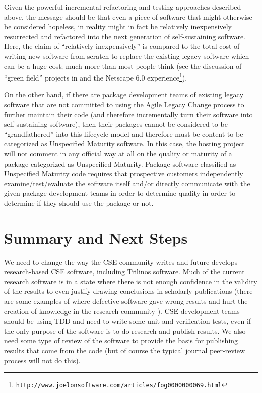 \documentclass[11pt]{SANDreport}
\begin{document}
Given the powerful incremental refactoring and testing approaches described above, the message should be that even a piece of software that might otherwise be considered hopeless, in reality might in fact be relatively inexpensively resurrected and refactored into the next generation of self-sustaining software.  Here, the claim of ``relatively inexpensively'' is compared to the total cost of writing new software from scratch to replace the existing legacy software which can be a huge cost; much more than most people think (see the discussion of ``green field'' projects in {}\cite{WorkingEffectivelyWithLegacyCode05} and the Netscape 6.0 experience\footnote{\texttt{http://www.joelonsoftware.com/articles/fog0000000069.html}}).

On the other hand, if there are package development teams of existing legacy software that are not committed to using the Agile Legacy Change process to further maintain their code (and therefore incrementally turn their software into self-sustaining software), then their packages cannot be considered to be ``grandfathered'' into this lifecycle model and therefore must be content to be categorized as Unspecified Maturity software.  In this case, the hosting project will not comment in any official way at all on the quality or maturity of a package categorized as Unspecified Maturity.  Package software classified as Unspecified Maturity code requires that prospective customers independently examine/test/evaluate the software itself and/or directly communicate with the given package development teams in order to determine quality in order to determine if they should use the package or not.


%
{}\section{Summary and Next Steps}
\label{sec:summary_next_steps}
%

We need to change the way the CSE community writes and future develops research-based CSE software, including Trilinos software.  Much of the current research software is in a state where there is not enough confidence in the validity of the results to even justify drawing conclusions in scholarly publications (there are some examples of where defective software gave wrong results and hurt the creation of knowledge in the research community {}\cite{ScientistsNightmareFiveRetractions2006}).  CSE development teams should be using TDD and need to write some unit and verification tests, even if the only purpose of the software is to do research and publish results.  We also need some type of review of the software to provide the basis for publishing results that come from the code (but of course the typical journal peer-review process will not do this).
\end{document}
